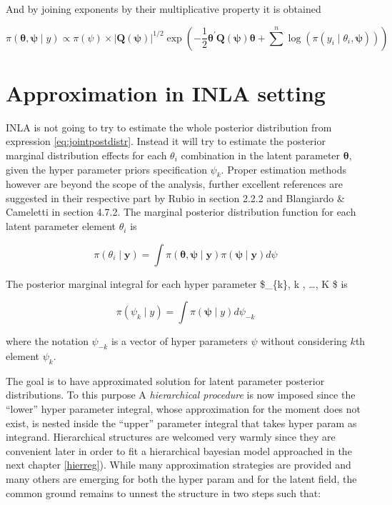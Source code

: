 \documentclass[
  12pt,
  a4paper,
  oneside]{book}
\begin{document}
And by joining exponents by their multiplicative property it is obtained

\begin{equation}
\pi(\boldsymbol{\theta}, \boldsymbol{\psi} \mid y) \propto \pi(\psi) \times|\boldsymbol{Q}(\boldsymbol{\psi})|^{1 / 2} \exp \left(-\frac{1}{2} \boldsymbol{\theta}^{\prime} \boldsymbol{Q}(\boldsymbol{\psi}) \boldsymbol{\theta}+\sum^{n} \log \left(\pi\left(y_{i} \mid \theta_{i}, \boldsymbol{\psi}\right)\right)\right)
\label{eq:jointpostdistr}
\end{equation}

\hypertarget{approx}{%
\section{Approximation in INLA setting}\label{approx}}

INLA is not going to try to estimate the whole posterior distribution from expression \eqref{eq:jointpostdistr}. Instead it will try to estimate the posterior marginal distribution effects for each \(\theta_{i}\) combination in the latent parameter \(\boldsymbol{\theta}\), given the hyper parameter priors specification \(\psi_{k}\). Proper estimation methods however are beyond the scope of the analysis, further excellent references are suggested in their respective part by Rubio \citeyearpar{Bayesian_INLA_Rubio} in section 2.2.2 and Blangiardo \& Cameletti \citeyearpar{Blangiardo-Cameletti} in section 4.7.2.
The marginal posterior distribution function for each latent parameter element \(\theta_{i}\) is

\begin{equation}
  \pi(\theta_{i} \mid \boldsymbol{y})=\int \pi(\boldsymbol{\theta}, \boldsymbol{\psi} \mid \mathbf{y}) \pi(\boldsymbol{\psi} \mid \mathbf{y}) d \psi
\label{eq:latentparam}
\end{equation}

The posterior marginal integral for each hyper parameter \$\psi\_\{k\}, \forall k , \ldots, K \$ is

\[
\pi\left(\psi_{k} \mid y\right)=\int \pi(\boldsymbol{\psi} \mid y) d \psi_{-k}
\]

where the notation \(\psi_{-k}\) is a vector of hyper parameters \(\psi\) without considering \(k\)th element \(\psi_{k}\).

The goal is to have approximated solution for latent parameter posterior distributions. To this purpose A \emph{hierarchical procedure} is now imposed since the ``lower'' hyper parameter integral, whose approximation for the moment does not exist, is nested inside the ``upper'' parameter integral that takes hyper param as integrand. Hierarchical structures are welcomed very warmly since they are convenient later in order to fit a hierarchical bayesian model approached in the next chapter \ref{hierreg}). While many approximation strategies are provided and many others are emerging for both the hyper param and for the latent field, the common ground remains to unnest the structure in two steps such that:
\end{document}

